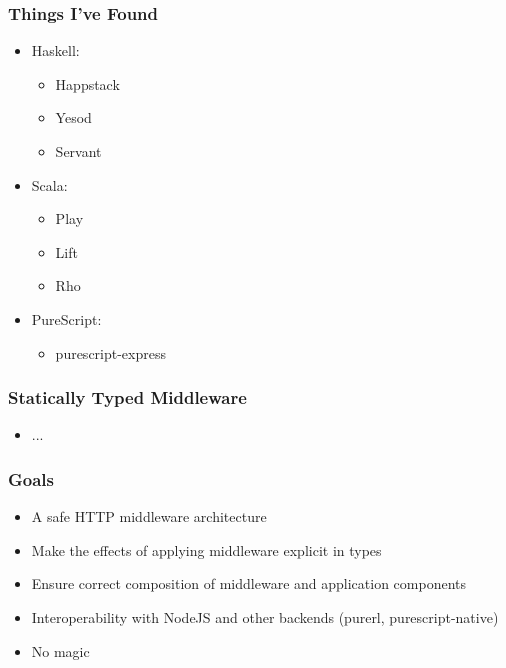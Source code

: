 \begin{frame}
  \frametitle{Things I've Found}
  \begin{itemize}
    \pause
    \item<+-> Haskell:
      \begin{itemize}
        \item<+-> Happstack
        \item<+-> Yesod
        \item<+-> Servant
      \end{itemize}
    \item<+-> Scala:
      \begin{itemize}
        \item<+-> Play
        \item<+-> Lift
        \item<+-> Rho
      \end{itemize}
    \item<+-> PureScript:
      \begin{itemize}
        \item<+-> purescript-express
      \end{itemize}
  \end{itemize}
\end{frame}

\begin{frame}
  \frametitle{Statically Typed Middleware}
  \begin{itemize}
    \pause
    \item<+-> ...
  \end{itemize}
\end{frame}


%
%


\begin{frame}
\end{frame}

\begin{frame}
  \frametitle{Goals}
  \begin{itemize}
    \pause
    \item<+-> A safe HTTP middleware architecture
    \item<+-> Make the effects of applying middleware explicit in types
    \item<+-> Ensure correct composition of middleware and application components
    \item<+-> Interoperability with NodeJS and other backends (purerl, purescript-native)
    \item<+-> No magic
  \end{itemize}
\end{frame}

